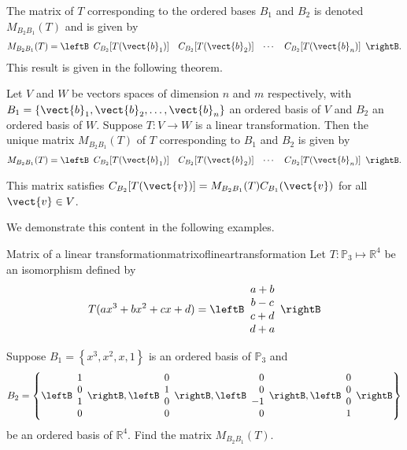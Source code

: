 The matrix of $T$ corresponding to the ordered
bases $B_1$ and $B_2$ is denoted $ M_{B_2B_1}(T)$ and is given by 
\[ M_{B_2B_1}(T)=
\leftB\begin{array}{cccc}
C_{B_2} [ T(\vect{b}_1)] & C_{B_2}[T(\vect{b}_2) ] &
\cdots & C_{B_2}[T(\vect{b}_n) ] \end{array}\rightB.\] 
This result is given in the following theorem. 

\begin{theorem}{}{}
Let $V$ and $W$ be vectors spaces of dimension
$n$ and $m$ respectively, with $B_1=\{\vect{b}_1, \vect{b}_2, \ldots, \vect{b}_n\}$ an
ordered basis of $V$ and $B_2$ an ordered basis of $W$. Suppose $T:V\to W$ is a linear transformation. Then the unique matrix $M_{B_2B_1}(T)$ of $T$ corresponding to $B_1$ and $B_2$ is given by 
\[ M_{B_2B_1}(T)=
\leftB\begin{array}{cccc}
C_{B_2}[T(\vect{b}_1)] & C_{B_2}[T(\vect{b}_2)] &
\cdots & C_{B_2}[T(\vect{b}_n)] \end{array}\rightB.\]

This matrix satisfies  $C_{B_2}[T(\vect{v})]=M_{B_2B_1}(T)C_{B_1}(\vect{v})$ for all $\vect{v}\in V$.
\end{theorem}

We demonstrate this content in the following examples. 

\begin{example}{Matrix of a linear transformation}{matrixoflineartransformation}
Let $T: \mathbb{P}_3 \mapsto \mathbb{R}^4$ be an isomorphism defined by
\[
T( ax^3 + bx^2 + cx + d) = \leftB \begin{array}{c}
a + b \\
b - c \\
c + d \\
d + a 
\end{array} \rightB
\]

Suppose $B_1 = \left\{ x^3, x^2, x, 1 \right\}$ is an ordered basis of $\mathbb{P}_3$ and 
\[
B_2 = \left\{ \leftB \begin{array}{r}
1 \\
0 \\
1 \\
0
\end{array} \rightB, \leftB \begin{array}{r}
0 \\
1 \\
0 \\
0
\end{array} \rightB, 
\leftB \begin{array}{r}
0 \\
0 \\
-1 \\
0
\end{array} \rightB, 
\leftB \begin{array}{r}
0 \\
0 \\
0 \\
1
\end{array} \rightB \right\} 
\]
be an ordered basis of $\mathbb{R}^4$.
Find the matrix $M_{B_2B_1}(T)$. 
\end{example}

